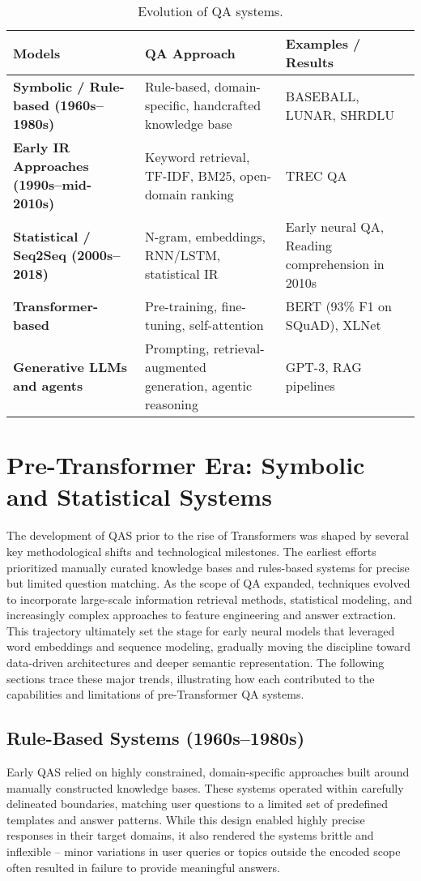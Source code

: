 \begin{spacing}{1.5}
\begin{table}[H]
\centering
\begin{tabularx}{\textwidth}{>{\raggedright\arraybackslash\bfseries}X >{\raggedright\arraybackslash}X >{\raggedright\arraybackslash}X}
\toprule
\textbf{Models} & \textbf{QA Approach} & \textbf{Examples / Results}\\
\midrule
Symbolic / Rule-based (1960s–1980s) & Rule-based, domain-specific, handcrafted knowledge base & BASEBALL, LUNAR, SHRDLU \\
Early IR Approaches (1990s–mid-2010s) & Keyword retrieval, TF-IDF, BM25, open-domain ranking & TREC QA \\
Statistical / Seq2Seq (2000s–2018) & N-gram, embeddings, RNN/LSTM, statistical IR & Early neural QA, Reading comprehension in 2010s \\
Transformer-based & Pre-training, fine-tuning, self-attention & BERT (93\% F1 on SQuAD), XLNet \\
Generative LLMs and agents & Prompting, retrieval-augmented generation, agentic reasoning & GPT-3, RAG pipelines \\
\bottomrule
\end{tabularx}
\caption{Evolution of QA systems.}
\label{tab:qa_evolution}
\end{table}

\section{Pre-Transformer Era: Symbolic and Statistical Systems}
The development of QAS prior to the rise of Transformers was shaped by several key methodological shifts and technological milestones. The earliest efforts prioritized manually curated knowledge bases and rules-based systems for precise but limited question matching. As the scope of QA expanded, techniques evolved to incorporate large-scale information retrieval methods, statistical modeling, and increasingly complex approaches to feature engineering and answer extraction. This trajectory ultimately set the stage for early neural models that leveraged word embeddings and sequence modeling, gradually moving the discipline toward data-driven architectures and deeper semantic representation. The following sections trace these major trends, illustrating how each contributed to the capabilities and limitations of pre-Transformer QA systems.

\subsection{Rule-Based Systems (1960s–1980s)}
Early QAS relied on highly constrained, domain-specific approaches built around manually constructed knowledge bases. These systems operated within carefully delineated boundaries, matching user questions to a limited set of predefined templates and answer patterns. While this design enabled highly precise responses in their target domains, it also rendered the systems brittle and inflexible -- minor variations in user queries or topics outside the encoded scope often resulted in failure to provide meaningful answers.


\end{spacing}

